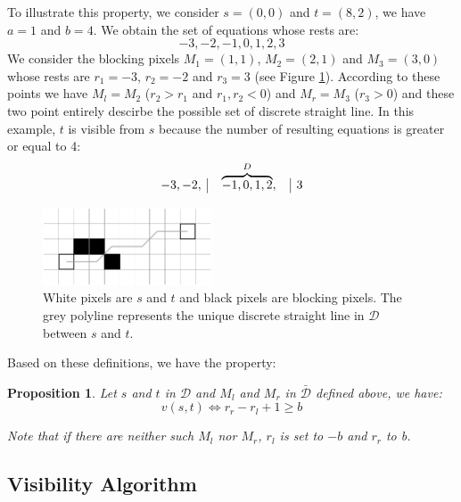 \documentclass{llncs}
\newtheorem{prop}{Proposition}
\begin{document}
To illustrate this property, we consider $s=(0,0)$ and $t=(8,2)$,  we have $a=1$ and $b=4$. We
obtain the set of equations whose rests are:
\begin{displaymath}
-3,-2,-1,0,1,2,3
\end{displaymath}
We consider the blocking pixels $M_1=(1,1)$, $M_2=(2,1)$ and $M_3=(3,0)$ whose rests are $r_1=-3$,
$r_2=-2$ and $r_3=3$ (see Figure \ref{fig:exemple}). According to these points we have $M_l=M_2$ ($r_2>r_1$ and $r_1,r_2<0$) and
$M_r=M_3$ ($r_3>0$) and these two point entirely descirbe the possible set of discrete straight
line. In this example, $t$ is visible from $s$ because the number of resulting equations is greater
or equal to 4:
\begin{displaymath}
  \begin{array}[b]{c|}-3,-2,
  \end{array}\quad
  \overbrace{-1,0,1,2}^{D},\quad\begin{array}{|c}3
  \end{array}
\end{displaymath}

\begin{figure}[!ht]
  \begin{center}
    \includegraphics[width=5cm]{exemple}
    \caption{White pixels are $s$ and $t$ and black pixels are blocking pixels. The grey polyline
      represents the unique discrete straight line in $\mathcal{D}$ between $s$ and $t$.}
    \label{fig:exemple}
  \end{center}
\end{figure}


Based on these definitions, we have the property:
\begin{prop}
Let $s$ and $t$ in $\mathcal{D}$ and $M_l$ and $M_r$ in $\bar{\mathcal{D}}$ defined above, we have:
\begin{equation}
v(s,t) \Leftrightarrow r_r-r_l+1 \geq b
\end{equation}

Note that if there are neither such $M_l$ nor $M_r$, $r_l$ is set to $-b$ and $r_r$ to b.
\label{prop1}
\end{prop}

\subsection{Visibility Algorithm}
\end{document}
